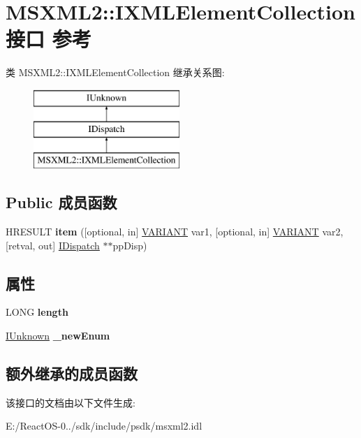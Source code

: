 \hypertarget{interface_m_s_x_m_l2_1_1_i_x_m_l_element_collection}{}\section{M\+S\+X\+M\+L2\+:\+:I\+X\+M\+L\+Element\+Collection接口 参考}
\label{interface_m_s_x_m_l2_1_1_i_x_m_l_element_collection}
类 M\+S\+X\+M\+L2\+:\+:I\+X\+M\+L\+Element\+Collection 继承关系图\+:\begin{figure}[H]
\begin{center}
\leavevmode
\includegraphics[height=3.000000cm]{interface_m_s_x_m_l2_1_1_i_x_m_l_element_collection}
\end{center}
\end{figure}
\subsection*{Public 成员函数}
\begin{DoxyCompactItemize}
\item 
\mbox{\label{interface_m_s_x_m_l2_1_1_i_x_m_l_element_collection_aa82eee670dd93d0fcfa8053470a6f3d6}} 
H\+R\+E\+S\+U\+LT {\bfseries item} (\mbox{[}optional, in\mbox{]} \hyperlink{structtag_v_a_r_i_a_n_t}{V\+A\+R\+I\+A\+NT} var1, \mbox{[}optional, in\mbox{]} \hyperlink{structtag_v_a_r_i_a_n_t}{V\+A\+R\+I\+A\+NT} var2, \mbox{[}retval, out\mbox{]} \hyperlink{interface_i_dispatch}{I\+Dispatch} $\ast$$\ast$pp\+Disp)
\end{DoxyCompactItemize}
\subsection*{属性}
\begin{DoxyCompactItemize}
\item 
\mbox{\label{interface_m_s_x_m_l2_1_1_i_x_m_l_element_collection_a5e97ceb69811a0a005d1b33205c2eb0f}} 
L\+O\+NG {\bfseries length}
\item 
\mbox{\label{interface_m_s_x_m_l2_1_1_i_x_m_l_element_collection_a246ac70535116bd5ebcda77b3e7c6189}} 
\hyperlink{interface_i_unknown}{I\+Unknown} {\bfseries \+\_\+new\+Enum}
\end{DoxyCompactItemize}
\subsection*{额外继承的成员函数}


该接口的文档由以下文件生成\+:\begin{DoxyCompactItemize}
\item 
E\+:/\+React\+O\+S-\/0../sdk/include/psdk/msxml2.\+idl\end{DoxyCompactItemize}
